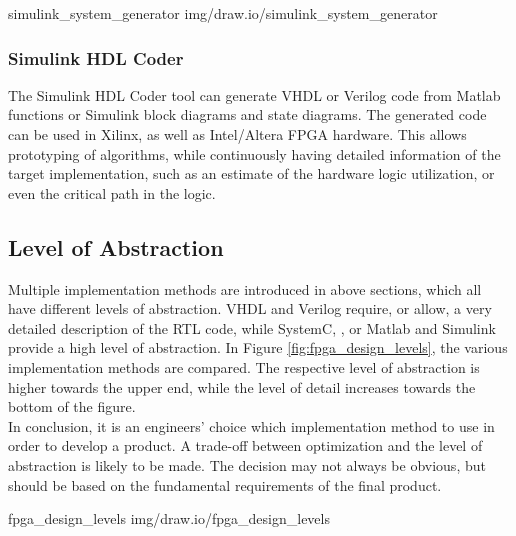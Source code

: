  {simulink_system_generator} {img/draw.io/simulink_system_generator}

\subsubsection{Simulink HDL Coder}

The Simulink HDL Coder tool can generate VHDL or Verilog code from Matlab functions or Simulink block diagrams and state diagrams.
The generated code can be used in Xilinx, as well as Intel/Altera FPGA hardware.
This allows prototyping of algorithms, while continuously having detailed information of the target implementation, such as an estimate of the hardware logic utilization, or even the critical path in the logic.

\subsection{Level of Abstraction}

Multiple implementation methods are introduced in above sections, which all have different levels of abstraction.
VHDL and Verilog require, or allow, a very detailed description of the RTL code, while SystemC, \cplusplus, or Matlab and Simulink provide a high level of abstraction.
In Figure \ref{fig:fpga_design_levels}, the various implementation methods are compared.
The respective level of abstraction is higher towards the upper end, while the level of detail increases towards the bottom of the figure.\\

In conclusion, it is an engineers' choice which implementation method to use in order to develop a product.
A trade-off between optimization and the level of abstraction is likely to be made.
The decision may not always be obvious, but should be based on the fundamental requirements of the final product.

 {fpga_design_levels} {img/draw.io/fpga_design_levels}

